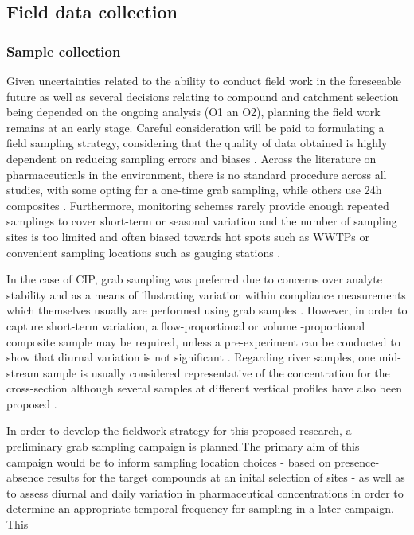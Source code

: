 \documentclass{article}
\begin{document}
\subsection{Field data collection}
\subsubsection{Sample collection}
Given uncertainties related to the ability to conduct field work in the foreseeable future as well as several decisions relating to compound and catchment selection being depended on the ongoing analysis (O1 an O2), planning the field work remains at an early stage. Careful consideration will be paid to formulating a field sampling strategy, considering that the quality of data obtained is highly dependent on reducing sampling errors and biases \citep{Ort2010SamplingReview}. Across the literature on pharmaceuticals in the environment, there is no standard procedure across all studies, with some opting for a one-time grab sampling, while others use 24h composites \citep{Verlicchi2012OccurrenceReview}. Furthermore, monitoring schemes rarely provide enough repeated samplings to cover short-term or seasonal variation \citep{Ort2010SamplingReview} and the number of sampling sites is too limited and often biased towards  hot spots such as WWTPs or convenient sampling locations such as gauging stations \citep{ausderBeek2016PharmaceuticalsPerspectives}. 

In the case of CIP, grab sampling was preferred due to concerns over analyte stability and as a means of illustrating variation within compliance measurements which themselves usually are performed using grab samples \citep{Gardner2012TheEffluents}. However, in order to capture short-term variation, a flow-proportional or volume -proportional composite sample may be required, unless a pre-experiment can be conducted to show that diurnal variation is not significant \citep{Ort2010SamplingReview}. Regarding river samples, one mid-stream sample is usually considered representative of the concentration for the cross-section although several samples at different vertical profiles have also been proposed \citep{Comoretto2005ComparingRiver}.

In order to develop the fieldwork strategy for this proposed research, a preliminary grab sampling campaign is planned.The primary aim of this campaign would be to inform sampling location choices - based on presence-absence results for the target compounds at an inital selection of sites - as well as to assess diurnal and daily variation in pharmaceutical concentrations in order to determine an appropriate temporal frequency for sampling in a later campaign. This 
\end{document}
